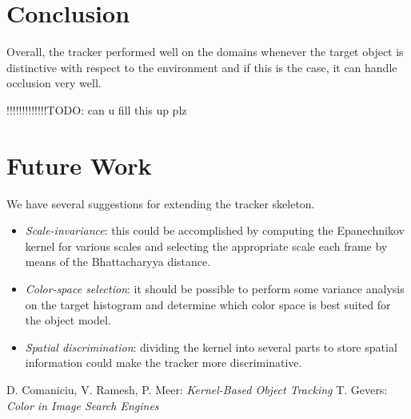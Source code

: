 \documentclass[a4paper,11pt]{article}
\begin{document}
	\section{Conclusion}
		Overall, the tracker performed well on the domains whenever the target object is distinctive with respect to the environment and if this is the case, it can handle occlusion very well. 
		
		
		!!!!!!!!!!!!!TODO: can u fill this up plz
		
		
		
	\section{Future Work}
		We have several suggestions for extending the tracker skeleton.

		\begin{itemize}
		\item{
			\emph{Scale-invariance}: this could be accomplished by computing the
			Epanechnikov kernel for various scales and selecting the appropriate
			scale each frame by means of the Bhattacharyya distance.
		}
		\item{
			\emph{Color-space selection}: it should be possible to perform some
			variance analysis on the target histogram and determine which color
			space is best suited for the object model.
		}
		\item{
			\emph{Spatial discrimination}: dividing the kernel into several parts
			to store spatial information could make the tracker more discriminative.
		}
		\end{itemize}

	\begin{thebibliography}{2}
			D. Comaniciu, V. Ramesh, P. Meer: \textit{Kernel-Based Object Tracking}
			T. Gevers: \textit{Color in Image Search Engines}
	\end{thebibliography}
\end{document}
